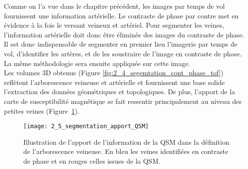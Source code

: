 Comme on l’a vue dans le chapitre précédent, les images par temps de vol fournissent une information artérielle. Le contraste de phase par contre met en évidence à la fois le versant veineux et artériel. Pour segmenter les veines, l’information artérielle doit donc être éliminée des images du contraste de phase. Il est donc indispensable de segmenter en premier lieu l’imagerie par temps de vol, d’identifier les artères, et de les soustraire de l’image en contraste de phase. La même méthodologie sera ensuite appliquée sur cette image.\\
Les volumes 3D obtenus (Figure \ref{fig:2_4_segemtation_cont_phase_tof}) reflètent l’arborescence veineuse et artérielle et fournissent une base solide l’extraction des données géométriques et topologiques. De plus, l’apport de la carte de susceptibilité magnétique se fait ressentir principalement au niveau des petites veines (Figure~\ref{fig:2_5_segmentation_apport_QSM}).
\begin{figure}[!t]
\centering
\texttt{[image: 2\_5\_segmentation\_apport\_QSM]}
\caption{Illustration de l'apport de l'information de la QSM dans la définition de l'arborescence veineuse. En bleu les veines identifiées en contraste de phase et en rouges celles issues de la QSM.}
\label{fig:2_5_segmentation_apport_QSM}	
\end{figure}	
